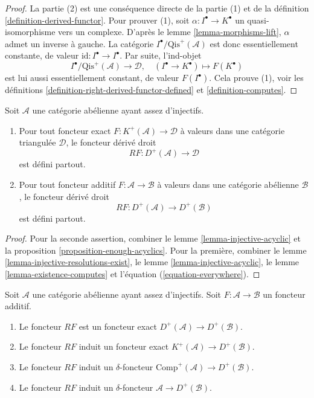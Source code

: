 \begin{proof}
La partie (2) est une conséquence directe de la partie (1) et de la
définition \ref{definition-derived-functor}.
Pour prouver (1), soit $\alpha : I^\bullet \to K^\bullet$ un
quasi-isomorphisme vers un complexe. D'après le
lemme \ref{lemma-morphisms-lift}, $\alpha$ admet un inverse à gauche. La
catégorie $I^\bullet/\text{Qis}^{+}(\mathcal{A})$ est donc essentiellement
constante, de valeur $\text{id} : I^\bullet \to I^\bullet$. Par suite,
l'ind-objet
$$
I^\bullet/\text{Qis}^{+}(\mathcal{A}) \longrightarrow \mathcal{D}, \quad
(I^\bullet \to K^\bullet) \longmapsto F(K^\bullet)
$$
est lui aussi essentiellement constant, de valeur $F(I^\bullet)$. Cela prouve
(1), voir les définitions
\ref{definition-right-derived-functor-defined} et \ref{definition-computes}.
\end{proof}

\begin{lemma}
\label{lemma-enough-injectives-right-derived}
Soit $\mathcal{A}$ une catégorie abélienne ayant assez d'injectifs.
\begin{enumerate}
\item Pour tout foncteur exact $F : K^{+}(\mathcal{A}) \to \mathcal{D}$ à
valeurs dans une catégorie triangulée $\mathcal{D}$, le foncteur dérivé
droit
$$
RF : D^{+}(\mathcal{A}) \longrightarrow \mathcal{D}
$$
est défini partout.
\item Pour tout foncteur additif $F : \mathcal{A} \to \mathcal{B}$ à
valeurs dans une catégorie abélienne $\mathcal{B}$, le foncteur dérivé
droit
$$
RF : D^{+}(\mathcal{A}) \longrightarrow D^{+}(\mathcal{B})
$$
est défini partout.
\end{enumerate}
\end{lemma}

\begin{proof}
Pour la seconde assertion, combiner le
lemme \ref{lemma-injective-acyclic} et la
proposition \ref{proposition-enough-acyclics}. Pour la première, combiner le
lemme \ref{lemma-injective-resolutions-exist}, le
lemme \ref{lemma-injective-acyclic}, le
lemme \ref{lemma-existence-computes} et l'équation
(\ref{equation-everywhere}).
\end{proof}

\begin{lemma}
\label{lemma-right-derived-properties}
Soit $\mathcal{A}$ une catégorie abélienne ayant assez d'injectifs.
Soit $F : \mathcal{A} \to \mathcal{B}$ un foncteur additif.
\begin{enumerate}
\item Le foncteur $RF$ est un foncteur exact
$D^{+}(\mathcal{A}) \to D^{+}(\mathcal{B})$.
\item Le foncteur $RF$ induit un foncteur exact
$K^{+}(\mathcal{A}) \to D^{+}(\mathcal{B})$.
\item Le foncteur $RF$ induit un $\delta$-foncteur
$\text{Comp}^{+}(\mathcal{A}) \to D^{+}(\mathcal{B})$.
\item Le foncteur $RF$ induit un $\delta$-foncteur
$\mathcal{A} \to D^{+}(\mathcal{B})$.
\end{enumerate}
\end{lemma}

